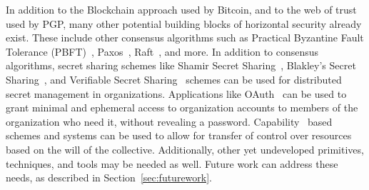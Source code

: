 In addition to the Blockchain approach used by Bitcoin, and to the web of trust
used by PGP, many other potential building blocks of horizontal security already
exist. These include other consensus algorithms such as Practical Byzantine
Fault Tolerance (PBFT)~\cite{castro1999practical}, Paxos~\cite{lamport2019part}, 
Raft~\cite{ongaro2013search}, and more. In addition to consensus algorithms,
secret sharing schemes like Shamir Secret Sharing~\cite{shamir1979share}, 
Blakley's Secret Sharing~\cite{blakley1993linear}, and Verifiable Secret 
Sharing~\cite{chor1985verifiable} schemes can be used for distributed secret
management in organizations. Applications like OAuth~\cite{leiba2012oauth} can
be used to grant minimal and ephemeral access to organization accounts to
members of the organization who need it, without revealing a password. 
Capability~\cite{dennis1966programming} based schemes and systems can be used to
allow for transfer of control over resources based on the will of the
collective. Additionally, other yet undeveloped primitives, techniques, and
tools may be needed as well. Future work can address these needs, as described
in Section~\ref{sec:futurework}.







